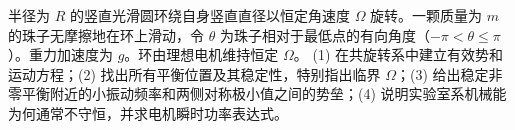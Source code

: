 半径为 \(R\) 的竖直光滑圆环绕自身竖直直径以恒定角速度 \(\Omega\) 旋转。一颗质量为 \(m\) 的珠子无摩擦地在环上滑动，令 \(\theta\) 为珠子相对于最低点的有向角度（\(-\pi<\theta\le\pi\)）。重力加速度为 \(g\)。环由理想电机维持恒定 \(\Omega\)。
(1) 在共旋转系中建立有效势和运动方程；(2) 找出所有平衡位置及其稳定性，特别指出临界 \(\Omega\)；(3) 给出稳定非零平衡附近的小振动频率和两侧对称极小值之间的势垒；(4) 说明实验室系机械能为何通常不守恒，并求电机瞬时功率表达式。
